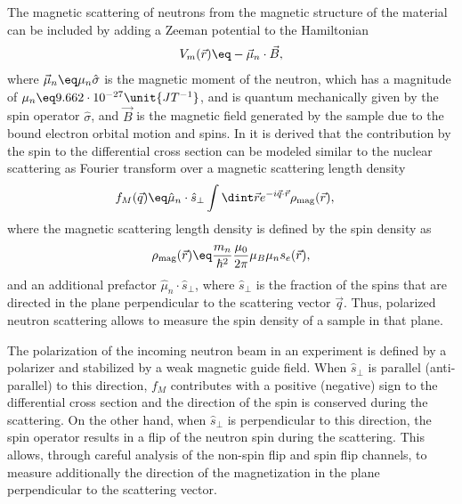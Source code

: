 \documentclass[\main/dresen_thesis.tex]{subfiles}
\begin{document}
    The magnetic scattering of neutrons from the magnetic structure of the material can be included by adding a Zeeman potential to the Hamiltonian
    \begin{align}
      V_m (\vec{r}) \eq - \vec{\mu}_n \cdot \vec{B},
    \end{align}
    where $\vec{\mu}_n \eq \mu_n \hat{\sigma}$ is the magnetic moment of the neutron, which has a magnitude of $\mu_n \eq 9.662 \cdot 10^{-27} \unit{JT^{-1}}$, and is quantum mechanically given by the spin operator $\hat{\sigma}$, and $\vec{B}$ is the magnetic field generated by the sample due to the bound electron orbital motion and spins.
    In  it is derived that the contribution by the spin to the differential cross section can be modeled similar to the nuclear scattering as Fourier transform over a magnetic scattering length density
    \begin{align}
      f_M (\vec{q}) \eq & \hat{\mu}_n \cdot \hat{s}_\perp \int \dint \vec{r} e^{- i \vec{q} \cdot \vec{r}} \rho_\mathrm{mag}(\vec{r}),
    \end{align}
    where the magnetic scattering length density is defined by the spin density as
    \begin{align}
      \rho_\mathrm{mag} (\vec{r}) \eq \frac{m_n}{\hbar^2}  \frac{\mu_0}{2\pi} \mu_B \mu_n s_e (\vec{r}),
      \label{eq:theoreticalBackground:scattering:magneticSLD}
    \end{align}
    and an additional prefactor $\hat{\mu}_n \cdot \hat{s}_\perp$, where $\hat{s}_\perp$ is the fraction of the spins that are directed in the plane perpendicular to the scattering vector $\vec{q}$.
    Thus, polarized neutron scattering allows to measure the spin density of a sample in that plane.

    The polarization of the incoming neutron beam in an experiment is defined by a polarizer and stabilized by a weak magnetic guide field.
    When $\hat{s}_\perp$ is parallel (anti-parallel) to this direction, $f_M$ contributes with a positive (negative) sign to the differential cross section and the direction of the spin is conserved during the scattering.
    On the other hand, when $\hat{s}_\perp$ is perpendicular to this direction, the spin operator results in a flip of the neutron spin during the scattering.
    This allows, through careful analysis of the non-spin flip and spin flip channels, to measure additionally the direction of the magnetization in the plane perpendicular to the scattering vector.
\end{document}
